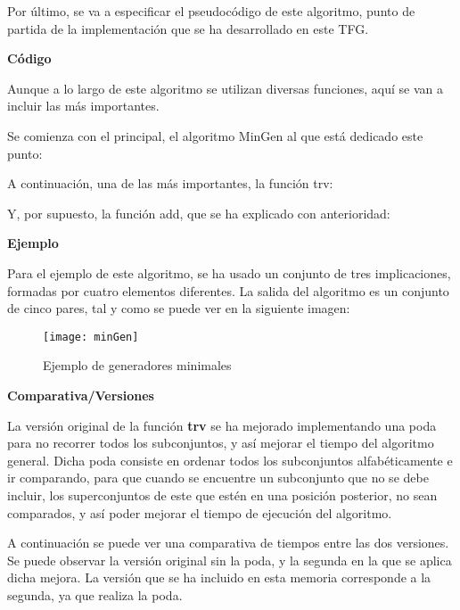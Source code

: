     Por \'ultimo, se va a especificar el pseudoc\'odigo de este algoritmo, punto de partida de la implementaci\'on que se ha desarrollado en este TFG.
    \bigskip

    

    \bigskip

    \bigskip

    \textbf{C\'odigo}

    Aunque a lo largo de este algoritmo se utilizan diversas funciones, aqu\'i se van a incluir las m\'as importantes.
    
    Se comienza con el principal, el algoritmo MinGen al que est\'a dedicado este punto:

    

    A continuaci\'on, una de las m\'as importantes, la funci\'on trv:

    

    Y, por supuesto, la funci\'on add, que se ha explicado con anterioridad:

    

    \bigskip
    \textbf{Ejemplo}

    Para el ejemplo de este algoritmo, se ha usado un conjunto de tres implicaciones, formadas por cuatro elementos diferentes.
    La salida del algoritmo es un conjunto de cinco pares, tal y como se puede ver en la siguiente imagen:

    \begin{figure}[H]
        \centering
        \texttt{[image: minGen]}
        \caption{Ejemplo de generadores minimales}
        \label{fig:minGen}
    \end{figure}

    

    \clearpage
    \textbf{Comparativa/Versiones}

    La versi\'on original de la funci\'on \textbf{trv} se ha mejorado implementando una poda para no recorrer todos los subconjuntos, y as\'i 
    mejorar el tiempo del algoritmo general. Dicha poda consiste en ordenar todos los subconjuntos alfab\'eticamente e ir comparando, para que 
    cuando se encuentre un subconjunto que no se debe incluir, los superconjuntos de este que est\'en en una posici\'on posterior, no sean 
    comparados, y as\'i poder mejorar el tiempo de ejecuci\'on del algoritmo.

    A continuaci\'on se puede ver una comparativa de tiempos entre las dos versiones. Se puede observar la versi\'on original sin la poda, y 
    la segunda en la que se aplica dicha mejora. La versi\'on que se ha incluido en esta memoria corresponde a la segunda, ya que 
    realiza la poda.

